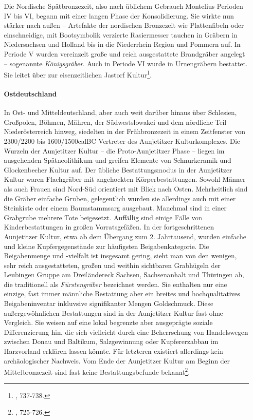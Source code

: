 \documentclass[openany,twoside,twocolumn]{book}
\let\rmarkdownfootnote\footnote%
\def\footnote{\protect\rmarkdownfootnote}
\begin{document}
Die Nordische Spätbronzezeit, also nach üblichem Gebrauch Montelius
Perioden IV bis VI, begann mit einer langen Phase der Konsolidierung.
Sie wirkte nun stärker nach außen -- Artefakte der nordischen Bronzezeit
wie Plattenfibeln oder einschneidige, mit Bootsymbolik verzierte
Rasiermesser tauchen in Gräbern in Niedersachsen und Holland bis in die
Niederrhein Region und Pommern auf. In Periode V wurden vereinzelt große
und reich ausgestattete Brandgräber angelegt -- sogenannte
\emph{Königsgräber}. Auch in Periode VI wurde in Urnengräbern bestattet.
Sie leitet über zur eisenzeitlichen Jastorf Kultur\footnote{\textcite{jockenhovel_germany_2013},
  737-738.}.

\hypertarget{ostdeutschland}{%
\paragraph{Ostdeutschland}\label{ostdeutschland}}

In Ost- und Mitteldeutschland, aber auch weit darüber hinaus über
Schlesien, Großpolen, Böhmen, Mähren, der Südwestslowakei und dem
nördliche Teil Niederösterreich hinweg, siedelten in der Frühbronzezeit
in einem Zeitfenster von 2300/2200 bis 1600/1500calBC Vertreter des
Aunjetitzer Kulturkomplexes. Die Wurzeln der Aunjetitzer Kultur -- die
Proto-Aunjetitzer Phase -- liegen im ausgehenden Spätneolithikum und
greifen Elemente von Schnurkeramik und Glockenbecher Kultur auf. Der
übliche Bestattungsmodus in der Aunjetitzer Kultur waren Flachgräber mit
angehockten Körperbestattungen. Sowohl Männer als auch Frauen sind
Nord-Süd orientiert mit Blick nach Osten. Mehrheitlich sind die Gräber
einfache Gruben, gelegentlich wurden sie allerdings auch mit einer
Steinkiste oder einem Baumstammsarg ausgebaut. Manchmal sind in einer
Grabgrube mehrere Tote beigesetzt. Auffällig sind einige Fälle von
Kinderbestattungen in großen Vorratsgefäßen. In der fortgeschrittenen
Aunjetitzer Kultur, etwa ab dem Übergang zum 2. Jahrtausend, wurden
einfache und kleine Kupfergegenstände zur häufigsten Beigabenkategorie.
Die Beigabenmenge und -vielfalt ist insgesamt gering, sieht man von den
wenigen, sehr reich ausgestatteten, großen und weithin sichtbaren
Grabhügeln der Leubingen Gruppe am Dreiländereck Sachsen, Sachsenanhalt
und Thüringen ab, die traditionell als \emph{Fürstengräber} bezeichnet
werden. Sie enthalten nur eine einzige, fast immer männliche Bestattung
aber ein breites und hochqualitatives Beigabeninventar inkluvsive
signifikanter Mengen Goldschmuck. Diese außergewöhnlichen Bestattungen
sind in der Aunjetitzer Kultur fast ohne Vergleich. Sie weisen auf eine
lokal begrenzte aber ausgeprägte soziale Differenzierung hin, die sich
vielleicht durch eine Beherrschung von Handelswegen zwischen Donau und
Baltikum, Salzgewinnung oder Kupfererzabbau im Harzvorland erklären
lassen könnte. Für letzteren existiert allerdings kein archäologischer
Nachweis. Vom Ende der Aunjetitzer Kultur am Beginn der Mittelbronzezeit
sind fast keine Bestattungsbefunde bekannt\footnote{\textcite{jockenhovel_germany_2013},
  725-726.}.
\end{document}
